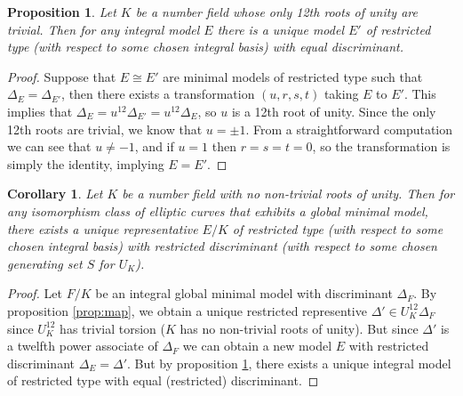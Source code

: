\documentclass{amsart}
\newtheorem{proposition}{Proposition}
\newtheorem{corollary}{Corollary}
\begin{document}
\begin{proposition}\label{prop:uniq}
  Let $K$ be a number field whose only 12th roots of unity
  are trivial. Then for any integral model $E$ there is a unique model $E'$ of
  restricted type (with respect to some chosen integral basis) with equal
  discriminant.
\end{proposition}

\begin{proof}
  Suppose that $E\cong E'$ are minimal models of restricted type such that
  $\Delta_E=\Delta_{E'}$, then there exists a transformation $(u,r,s,t)$
  taking $E$ to $E'$. This implies that
  $\Delta_E=u^{12}\Delta_{E'}=u^{12}\Delta_E$, so $u$ is a 12th root of unity.
  Since the only 12th roots are trivial, we know that $u=\pm1$. From a
  straightforward computation we can see that $u\neq -1$, and if $u=1$
  then $r=s=t=0$, so the transformation is simply the identity, implying
  $E=E'$.
\end{proof}


\begin{corollary}
  Let $K$ be a number field with no non-trivial roots of unity. Then for any
  isomorphism class of elliptic curves that exhibits a global minimal model,
  there exists a unique representative $E/K$ of restricted type (with respect
  to some chosen integral basis) with restricted discriminant (with respect to
  some chosen generating set $S$ for $U_K$).
\end{corollary}
\begin{proof}
  Let $F/K$ be an integral global minimal model with discriminant $\Delta_F$.
  By proposition \ref{prop:map}, we obtain a unique
  restricted representive $\Delta' \in U_K^{12}\Delta_F$ since $U_K^{12}$ has
  trivial torsion ($K$ has no non-trivial roots of unity). But since $\Delta'$
  is a twelfth power associate of $\Delta_F$ we can obtain a new model $E$
  with restricted discriminant $\Delta_E=\Delta'$. But by proposition
  \ref{prop:uniq}, there exists a unique integral model of restricted type with
  equal (restricted) discriminant.
\end{proof}
\end{document}
